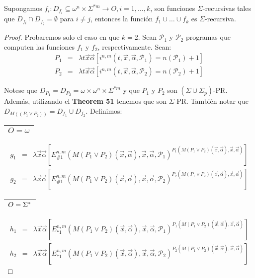   \begin{lemma}
    \PN Supongamos $f_{i}: D_{f_{i}} \subseteq \omega^{n}\times \Sigma^{\ast m} \rightarrow O, i=1, \dotsc, k$, son
    funciones $\Sigma$-recursivas tales que $D_{f_{i}} \cap D_{f_{j}} = \emptyset$ para $i \neq j$, entonces la función
    $f_{1} \cup \dotsc \cup f_{k}$ es $\Sigma$-recursiva.
  \end{lemma}
  \begin{proof}
    \PN Probaremos solo el caso en que $k = 2$. Sean $\mathcal{P}_{1}$ y $ \mathcal{P}_{2}$ programas que computen las
    funciones $f_{1}$ y $f_{2}$, respectivamente. Sean:
    \begin{eqnarray*}
      P_{1} &=& \lambda t\vec{x}\vec{\alpha}\left[i^{n,m}(t,\vec{x},\vec{\alpha},\mathcal{P}_{1}) = n(\mathcal{P}_{1}) +
        1\right] \\
      P_{2} &=& \lambda t\vec{x}\vec{\alpha}\left[i^{n,m}(t,\vec{x},\vec{\alpha},\mathcal{P}_{2}) = n(\mathcal{P}_{2}) +
        1\right]
    \end{eqnarray*}

    \PN Notese que $D_{P_{1}} = D_{P_{2}} = \omega \times \omega^{n} \times \Sigma^{\ast m}$ y que $P_{1}$ y $P_{2}$ son
    $(\Sigma \cup \Sigma_{p})$-PR. Además, utilizando el \textbf{Theorem 51} tenemos que son $\Sigma$-PR. También notar
    que $D_{M((P_{1} \vee P_{2}))} = D_{f_{1}} \cup D_{f_{2}}$. Definimos:

    \PN \begin{tabular}{|c|} \hline $O = \omega$ \\\hline \end{tabular}
    \begin{eqnarray*}
      g_{1} & =& \lambda \vec{x}\vec{\alpha}\left[E_{\# 1}^{n,m} (M \left(P_{1} \vee P_{2}\right)(\vec{x},
        \vec{\alpha}),\vec{x},\vec{\alpha},\mathcal{P}_{1})^{P_{1} (M (P_{1} \vee P_{2})(\vec{x},\vec{\alpha}),\vec{x},
        \vec{\alpha})}\right] \\
      g_{2} & =& \lambda \vec{x}\vec{\alpha}\left[E_{\# 1}^{n,m} (M \left(P_{1} \vee P_{2}\right)(\vec{x},
        \vec{\alpha}),\vec{x},\vec{\alpha},\mathcal{P}_{2})^{P_{2} (M (P_{1} \vee P_{2})(\vec{x},\vec{\alpha}),\vec{x},
        \vec{\alpha})}\right]
    \end{eqnarray*}

    \PN \begin{tabular}{|c|} \hline $O = \Sigma^{\ast}$ \\\hline \end{tabular}
    \begin{eqnarray*}
      h_{1} & =& \lambda \vec{x}\vec{\alpha}\left[E_{\ast 1}^{n,m} (M \left(P_{1} \vee P_{2}\right)(\vec{x},
        \vec{\alpha}),\vec{x},\vec{\alpha},\mathcal{P}_{1})^{P_{1} (M (P_{1} \vee P_{2})(\vec{x},\vec{\alpha}),\vec{x},
        \vec{\alpha})}\right] \\
      h_{2} & =& \lambda \vec{x}\vec{\alpha}\left[E_{\ast 1}^{n,m} (M \left(P_{1} \vee P_{2}\right)(\vec{x},
        \vec{\alpha}),\vec{x},\vec{\alpha},\mathcal{P}_{2})^{P_{2} (M (P_{1} \vee P_{2})(\vec{x},\vec{\alpha}),\vec{x},
        \vec{\alpha})}\right]
    \end{eqnarray*}


\end{proof}
